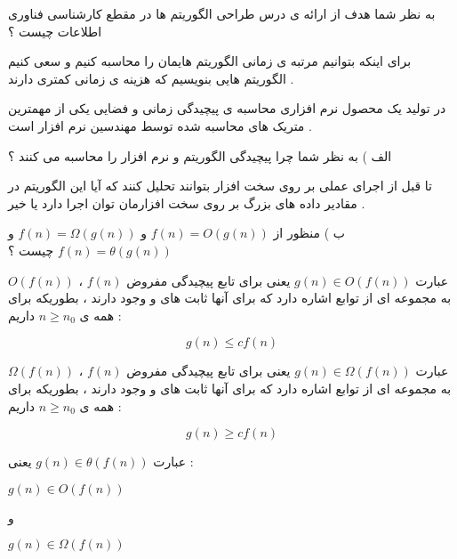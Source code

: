 \documentclass[12pt]{article}
\begin{document}
\noindent
به نظر شما هدف از ارائه ی درس طراحی الگوریتم ها در مقطع کارشناسی فناوری اطلاعات چیست ؟

\begin{tcolorbox}
برای اینکه بتوانیم مرتبه ی زمانی الگوریتم هایمان را محاسبه کنیم و سعی کنیم الگوریتم هایی بنویسیم که هزینه ی زمانی کمتری دارند .
\end{tcolorbox}

\vspace{30pt}

\noindent
در تولید یک محصول نرم افزاری محاسبه ی پیچیدگی زمانی و فضایی یکی از مهمترین متریک های محاسبه شده توسط مهندسین نرم افزار است .

\noindent
الف ) به نظر شما چرا پیچیدگی الگوریتم و نرم افزار را محاسبه می کنند ؟

\begin{tcolorbox}
تا قبل از اجرای عملی بر روی سخت افزار بتوانند تحلیل کنند که آیا این الگوریتم در مقادیر داده های بزرگ بر روی سخت افزارمان توان اجرا دارد یا خیر .
\end{tcolorbox}

\vspace{30pt}


\noindent
ب ) منظور از 
$f(n) = O(g(n))$
و
$f(n) = \Omega(g(n))$
و
$f(n) = \theta(g(n))$
چیست ؟

\begin{tcolorbox}

عبارت
$g(n) \in O(f(n))$
یعنی برای تابع پیچیدگی مفروض 
$f(n)$
،
$O(f(n))$
به مجموعه ای از توابع اشاره دارد که برای آنها ثابت های 
و
وجود دارند ، بطوریکه برای همه ی 
$n \geq n_{0}$
داریم :

$$
g(n) \leq cf(n)
$$
\end{tcolorbox}





\begin{tcolorbox}

عبارت
$g(n) \in \Omega(f(n))$
یعنی برای تابع پیچیدگی مفروض 
$f(n)$
،
$\Omega(f(n))$
به مجموعه ای از توابع اشاره دارد که برای آنها ثابت های 
و
وجود دارند ، بطوریکه برای همه ی 
$n \geq n_{0}$
داریم :

$$
g(n) \geq cf(n)
$$
\end{tcolorbox}




\begin{tcolorbox}

عبارت
$g(n) \in \theta(f(n))$
یعنی :

\begin{center}
$g(n) \in O(f(n))$

و

$g(n) \in \Omega(f(n))$
\end{center}
\end{tcolorbox}
\end{document}
